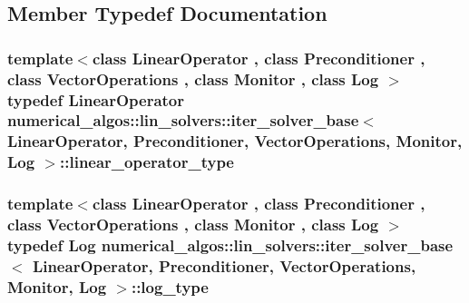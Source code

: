 \subsection{Member Typedef Documentation}
\hypertarget{classnumerical__algos_1_1lin__solvers_1_1iter__solver__base_a547488978437ea7057c7fb113261407d}{
\subsubsection[{linear\-\_\-operator\-\_\-type}]{\setlength{\rightskip}{0pt plus 5cm}template$<$class Linear\-Operator , class Preconditioner , class Vector\-Operations , class Monitor , class Log $>$ typedef Linear\-Operator {\bf numerical\-\_\-algos\-::lin\-\_\-solvers\-::iter\-\_\-solver\-\_\-base}$<$ Linear\-Operator, Preconditioner, Vector\-Operations, Monitor, Log $>$\-::{\bf linear\-\_\-operator\-\_\-type}}}\label{classnumerical__algos_1_1lin__solvers_1_1iter__solver__base_a547488978437ea7057c7fb113261407d}
\hypertarget{classnumerical__algos_1_1lin__solvers_1_1iter__solver__base_ae5dde4a29dad1ba2bf67932b70d22b4c}{
\subsubsection[{log\-\_\-type}]{\setlength{\rightskip}{0pt plus 5cm}template$<$class Linear\-Operator , class Preconditioner , class Vector\-Operations , class Monitor , class Log $>$ typedef Log {\bf numerical\-\_\-algos\-::lin\-\_\-solvers\-::iter\-\_\-solver\-\_\-base}$<$ Linear\-Operator, Preconditioner, Vector\-Operations, Monitor, Log $>$\-::{\bf log\-\_\-type}}}\label{classnumerical__algos_1_1lin__solvers_1_1iter__solver__base_ae5dde4a29dad1ba2bf67932b70d22b4c}
